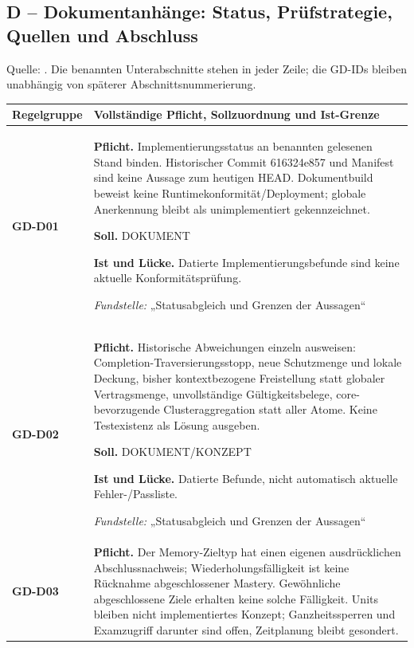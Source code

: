 \subsection{D -- Dokumentanhänge: Status, Prüfstrategie, Quellen und Abschluss}
Quelle: . Die benannten Unterabschnitte stehen in jeder Zeile; die GD-IDs bleiben unabhängig von späterer Abschnittsnummerierung.

\begingroup\small
\begin{longtable}{@{}P{20mm}P{128mm}@{}}
\toprule
Regelgruppe & Vollständige Pflicht, Sollzuordnung und Ist-Grenze\\
\midrule\endhead
{}\label{rule:GD-D01}\textbf{GD-D01} &
\textbf{Pflicht.} Implementierungsstatus an benannten gelesenen Stand binden. Historischer Commit 616324e857 und Manifest sind keine Aussage zum heutigen HEAD. Dokumentbuild beweist keine Runtimekonformität/Deployment; globale Anerkennung bleibt als unimplementiert gekennzeichnet.\par\smallskip
\textbf{Soll.} DOKUMENT\par\smallskip
\textbf{Ist und Lücke.} Datierte Implementierungsbefunde sind keine aktuelle Konformitätsprüfung.\par\smallskip
\emph{Fundstelle:} „Statusabgleich und Grenzen der Aussagen“\\\addlinespace[5pt]
\label{rule:GD-D02}\textbf{GD-D02} &
\textbf{Pflicht.} Historische Abweichungen einzeln ausweisen: Completion-Traversierungsstopp, neue Schutzmenge und lokale Deckung, bisher kontextbezogene Freistellung statt globaler Vertragsmenge, unvollständige Gültigkeitsbelege, core-bevorzugende Clusteraggregation statt aller Atome. Keine Testexistenz als Lösung ausgeben.\par\smallskip
\textbf{Soll.} DOKUMENT/KONZEPT\par\smallskip
\textbf{Ist und Lücke.} Datierte Befunde, nicht automatisch aktuelle Fehler-/Passliste.\par\smallskip
\emph{Fundstelle:} „Statusabgleich und Grenzen der Aussagen“\\\addlinespace[5pt]
\label{rule:GD-D03}\textbf{GD-D03} &
\textbf{Pflicht.} Der Memory-Zieltyp hat einen eigenen ausdrücklichen Abschlussnachweis; Wiederholungsfälligkeit ist keine Rücknahme abgeschlossener Mastery. Gewöhnliche abgeschlossene Ziele erhalten keine solche Fälligkeit. Units bleiben nicht implementiertes Konzept; Ganzheitssperren und Examzugriff darunter sind offen, Zeitplanung bleibt gesondert.\par\smallskip

\end{longtable}
